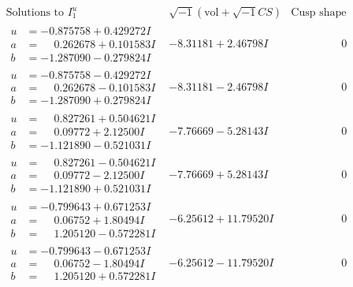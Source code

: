 \documentclass[1p]{elsarticle_modified}
\theoremstyle{definition}
\newcommand{\I}{\sqrt{-1}}
\begin{document}
$$\begin{array}{c|c|c}  
\text{Solutions to }I^u_{1}& \I (\text{vol} + \sqrt{-1}CS) & \text{Cusp shape}\\
 \hline 
\begin{aligned}
u &= -0.875758 + 0.429272 I \\
a &= \phantom{-}0.262678 + 0.101583 I \\
b &= -1.287090 - 0.279824 I\end{aligned}
 & -8.31181 + 2.46798 I & \phantom{-0.000000 } 0 \\ \hline\begin{aligned}
u &= -0.875758 - 0.429272 I \\
a &= \phantom{-}0.262678 - 0.101583 I \\
b &= -1.287090 + 0.279824 I\end{aligned}
 & -8.31181 - 2.46798 I & \phantom{-0.000000 } 0 \\ \hline\begin{aligned}
u &= \phantom{-}0.827261 + 0.504621 I \\
a &= \phantom{-}0.09772 + 2.12500 I \\
b &= -1.121890 - 0.521031 I\end{aligned}
 & -7.76669 - 5.28143 I & \phantom{-0.000000 } 0 \\ \hline\begin{aligned}
u &= \phantom{-}0.827261 - 0.504621 I \\
a &= \phantom{-}0.09772 - 2.12500 I \\
b &= -1.121890 + 0.521031 I\end{aligned}
 & -7.76669 + 5.28143 I & \phantom{-0.000000 } 0 \\ \hline\begin{aligned}
u &= -0.799643 + 0.671253 I \\
a &= \phantom{-}0.06752 + 1.80494 I \\
b &= \phantom{-}1.205120 - 0.572281 I\end{aligned}
 & -6.25612 + 11.79520 I & \phantom{-0.000000 } 0 \\ \hline\begin{aligned}
u &= -0.799643 - 0.671253 I \\
a &= \phantom{-}0.06752 - 1.80494 I \\
b &= \phantom{-}1.205120 + 0.572281 I\end{aligned}
 & -6.25612 - 11.79520 I & \phantom{-0.000000 } 0 \\ \hline\begin{aligned}

\end{aligned}
\end{array}$$
\end{document}
